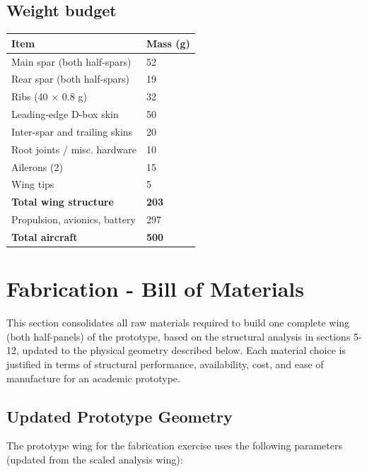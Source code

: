 \documentclass[10pt,a4paper]{article}
\begin{document}
\subsection{Weight budget}

\begin{center}
\begin{tabular}{|l|l|}
\hline
Item & Mass (g) \\
\hline
Main spar (both half-spars) & 52 \\
\hline
Rear spar (both half-spars) & 19 \\
\hline
Ribs (40 ${\times}$ 0.8 g) & 32 \\
\hline
Leading-edge D-box skin & 50 \\
\hline
Inter-spar and trailing skins & 20 \\
\hline
Root joints / misc. hardware & 10 \\
\hline
Ailerons (2) & 15 \\
\hline
Wing tips & 5 \\
\hline
\textbf{Total wing structure} & \textbf{203} \\
\hline
Propulsion, avionics, battery & 297 \\
\hline
\textbf{Total aircraft} & \textbf{500} \\
\hline
\end{tabular}
\end{center}

\newpage \section{Fabrication - Bill of Materials}

This section consolidates all raw materials required to build one complete wing (both half-panels) of the prototype, based on the structural analysis in sections 5-12, updated to the physical geometry described below. Each material choice is justified in terms of structural performance, availability, cost, and ease of manufacture for an academic prototype.

\subsection{Updated Prototype Geometry}

The prototype wing for the fabrication exercise uses the following parameters (updated from the scaled analysis wing):
\end{document}
